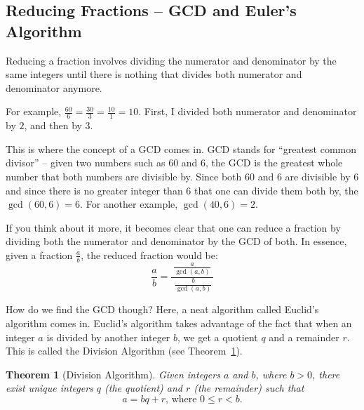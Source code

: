 \documentclass[11pt]{cselabheader}
\theoremstyle{plain}
\newtheorem{thm}{Theorem}
\begin{document}
%

\begin{appendices}
	\section{Reducing Fractions -- GCD and Euler's Algorithm}
	\label{sec:gcd}

	Reducing a fraction involves dividing the numerator and denominator by
	the same integers until there is nothing that divides both numerator and
	denominator anymore.

	For example, $\frac{60}{6} = \frac{30}{3} = \frac{10}{1} = 10$. First, I
	divided both numerator and denominator by $2$, and then by $3$. 

	This is where the concept of a GCD comes in. GCD stands for ``greatest
	common divisor'' -- given two numbers such as $60$ and $6$, the GCD is the
	greatest whole number that both numbers are divisible by. Since both $60$ 
	and $6$ are divisible by $6$ and since there is no greater integer than $6$
	that one can divide them both by, the $\gcd(60, 6) = 6$. For another
	example, $\gcd(40, 6) = 2$.

	If you think about it more, it becomes clear that one can reduce a fraction
	by dividing both the numerator and denominator by the GCD of both. In
	essence, given a fraction $\frac{a}{b}$, the reduced fraction would be:
	\[
		\frac{a}{b} = \frac{~\frac{a}{\gcd(a, b)}~}{~\frac{b}{\gcd(a, b)}}
	\]

	How do we find the GCD though? Here, a neat algorithm called Euclid's
	algorithm comes in. Euclid's algorithm takes advantage of the fact that
	when an integer $a$ is divided by another integer $b$, we get a quotient
	$q$ and a remainder $r$. This is called the Division Algorithm (see
	Theorem~\ref{thm:div}). 

	\begin{thm}[Division Algorithm] \label{thm:div}
		Given integers $a$ and $b$, where $b > 0$, there exist unique integers
		$q$ (the quotient) and $r$ (the remainder) such that 
		\[ a = bq + r\text{, where }0 \leq r < b. \]
	\end{thm}


\end{appendices}
\end{document}
